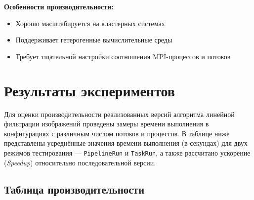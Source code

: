 \documentclass[12pt]{article}
\begin{document}
\textbf{Особенности производительности:}

\begin{itemize}
\item Хорошо масштабируется на кластерных системах
\item Поддерживает гетерогенные вычислительные среды
\item Требует тщательной настройки соотношения MPI-процессов и потоков
\end{itemize}

\section{Результаты экспериментов}

\hspace*{1.25em}Для оценки производительности реализованных версий алгоритма линейной фильтрации изображений  проведены замеры времени выполнения в конфигурациях с различным числом потоков и процессов. В таблице ниже представлены усреднённые значения времени выполнения (в секундах) для двух режимов тестирования — \texttt{PipelineRun} и \texttt{TaskRun}, а также рассчитано ускорение (\textit{Speedup}) относительно последовательной версии.

\subsection{Таблица производительности}
\end{document}

